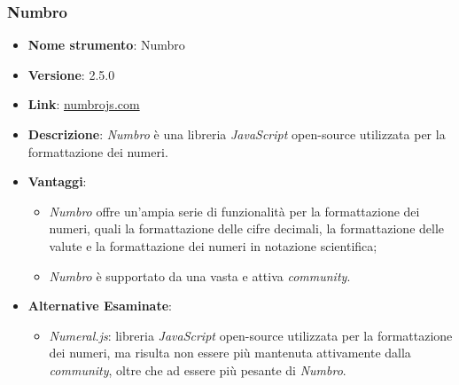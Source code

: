 \subsubsection{Numbro}
\begin{itemize}
      \item \textbf{Nome strumento}: Numbro
      \item \textbf{Versione}: 2.5.0
      \item \textbf{Link}: \href{http://numbrojs.com/}{numbrojs.com}
      \item \textbf{Descrizione}: \textit{Numbro} è una libreria \textit{JavaScript} open-source utilizzata per la formattazione dei numeri.
      \item \textbf{Vantaggi}:
            \begin{itemize}
                  \item \textit{Numbro} offre un'ampia serie di funzionalità per la formattazione dei numeri, quali la formattazione delle cifre decimali, la formattazione delle valute
                        e la formattazione dei numeri in notazione scientifica;
                  \item \textit{Numbro} è supportato da una vasta e attiva \textit{community}.
            \end{itemize}
      \item \textbf{Alternative Esaminate}:
            \begin{itemize}
                  \item \textit{Numeral.js}: libreria \textit{JavaScript} open-source utilizzata per la formattazione dei numeri, ma risulta non essere più mantenuta attivamente dalla \textit{community}, oltre
                        che ad essere più pesante di \textit{Numbro}.
            \end{itemize}
\end{itemize}

